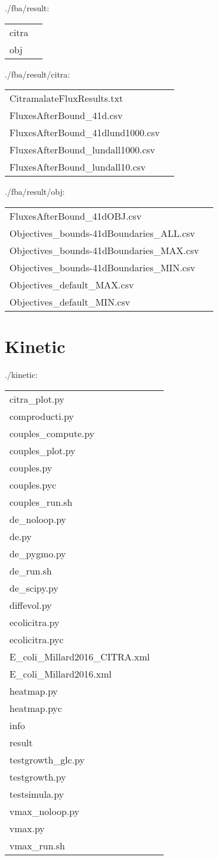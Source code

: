 \documentclass[a4paper, parskip=full]{scrreprt}
\begin{document}
./fba/result:

\begin{longtable}{ll}
citra\\
obj
\end{longtable}

./fba/result/citra:

\begin{longtable}{ll}
CitramalateFluxResults.txt\\
FluxesAfterBound\_41d.csv\\
FluxesAfterBound\_41dlund1000.csv\\
FluxesAfterBound\_lundall1000.csv\\
FluxesAfterBound\_lundall10.csv
\end{longtable}

./fba/result/obj:

\begin{longtable}{ll}
FluxesAfterBound\_41dOBJ.csv\\
Objectives\_bounds-41dBoundaries\_ALL.csv\\
Objectives\_bounds-41dBoundaries\_MAX.csv\\
Objectives\_bounds-41dBoundaries\_MIN.csv\\
Objectives\_default\_MAX.csv\\
Objectives\_default\_MIN.csv
\end{longtable}

\chapter{Kinetic}
\label{ch:kinetic}

./kinetic:

\begin{longtable}{ll}
citra\_plot.py\\
comproducti.py\\
couples\_compute.py\\
couples\_plot.py\\
couples.py\\
couples.pyc\\
couples\_run.sh\\
de\_noloop.py\\
de.py\\
de\_pygmo.py\\
de\_run.sh\\
de\_scipy.py\\
diffevol.py\\
ecolicitra.py\\
ecolicitra.pyc\\
E\_coli\_Millard2016\_CITRA.xml\\
E\_coli\_Millard2016.xml\\
heatmap.py\\
heatmap.pyc\\
info\\
result\\
testgrowth\_glc.py\\
testgrowth.py\\
testsimula.py\\
vmax\_noloop.py\\
vmax.py\\
vmax\_run.sh
\end{longtable}
\end{document}
